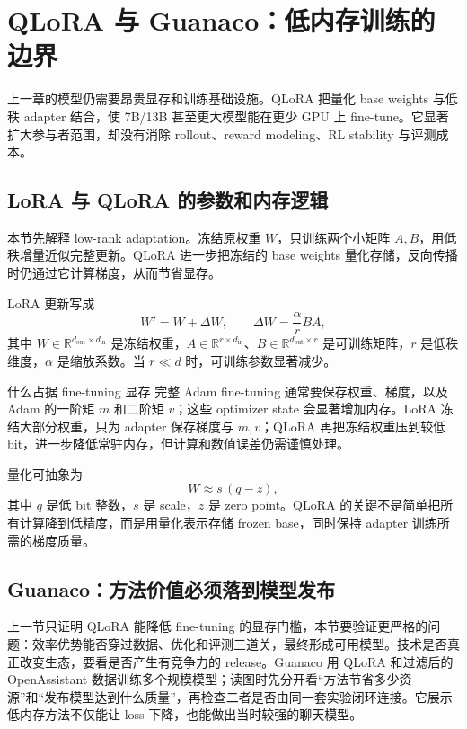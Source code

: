 \section{QLoRA 与 Guanaco：低内存训练的边界}

上一章的模型仍需要昂贵显存和训练基础设施。QLoRA 把量化 base weights 与低秩 adapter 结合，使 7B/13B 甚至更大模型能在更少 GPU 上 fine-tune。它显著扩大参与者范围，却没有消除 rollout、reward modeling、RL stability 与评测成本。

\subsection{LoRA 与 QLoRA 的参数和内存逻辑}

本节先解释 low-rank adaptation。冻结原权重 $W$，只训练两个小矩阵 $A,B$，用低秩增量近似完整更新。QLoRA 进一步把冻结的 base weights 量化存储，反向传播时仍通过它计算梯度，从而节省显存。


LoRA 更新写成
\[
W'=W+\Delta W,
\qquad \Delta W=\frac{\alpha}{r}BA,
\]
其中 $W\in\mathbb{R}^{d_{\mathrm{out}}\times d_{\mathrm{in}}}$ 是冻结权重，$A\in\mathbb{R}^{r\times d_{\mathrm{in}}}$、$B\in\mathbb{R}^{d_{\mathrm{out}}\times r}$ 是可训练矩阵，$r$ 是低秩维度，$\alpha$ 是缩放系数。当 $r\ll d$ 时，可训练参数显著减少。


\begin{knowledgebox}{什么占据 fine-tuning 显存}
完整 Adam fine-tuning 通常要保存权重、梯度，以及 Adam 的一阶矩 $m$ 和二阶矩 $v$；这些 optimizer state 会显著增加内存。LoRA 冻结大部分权重，只为 adapter 保存梯度与 $m,v$；QLoRA 再把冻结权重压到较低 bit，进一步降低常驻内存，但计算和数值误差仍需谨慎处理。
\end{knowledgebox}

量化可抽象为
\[
W\approx s\,(q-z),
\]
其中 $q$ 是低 bit 整数，$s$ 是 scale，$z$ 是 zero point。QLoRA 的关键不是简单把所有计算降到低精度，而是用量化表示存储 frozen base，同时保持 adapter 训练所需的梯度质量。

\subsection{Guanaco：方法价值必须落到模型发布}

上一节只证明 QLoRA 能降低 fine-tuning 的显存门槛，本节要验证更严格的问题：效率优势能否穿过数据、优化和评测三道关，最终形成可用模型。技术是否真正改变生态，要看是否产生有竞争力的 release。Guanaco 用 QLoRA 和过滤后的 OpenAssistant 数据训练多个规模模型；读图时先分开看“方法节省多少资源”和“发布模型达到什么质量”，再检查二者是否由同一套实验闭环连接。它展示低内存方法不仅能让 loss 下降，也能做出当时较强的聊天模型。

